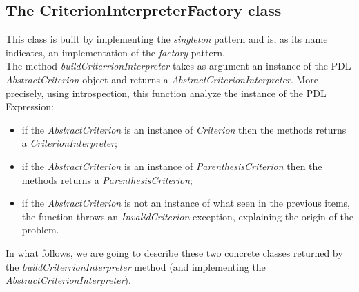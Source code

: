 \documentclass[a4paper,11pt] {ivoa}
\begin{document}
\subsection{The CriterionInterpreterFactory class}\label{criterionFactory}
This class is built by implementing the {\it singleton} pattern and is, as its name indicates, an implementation of the {\it factory} pattern.\\
The method {\it buildCriterrionInterpreter} takes as argument an instance of the PDL {\it AbstractCriterion} object and returns a {\it AbstractCriterionInterpreter}.
More precisely, using introspection, this function analyze the instance of the PDL Expression:
\begin{itemize}
\item if the {\it AbstractCriterion} is an instance of {\it Criterion} then the methods returns a {\it CriterionInterpreter};
\item if the {\it AbstractCriterion} is an instance of {\it ParenthesisCriterion} then the methods returns a {\it ParenthesisCriterion};
\item if the {\it AbstractCriterion} is not an instance of what seen in the previous items, the function throws an {\it InvalidCriterion} exception, explaining the origin of the problem.
\end{itemize} 
In what follows, we are going to describe these two concrete classes returned by the  {\it buildCriterrionInterpreter} method (and implementing the {\it AbstractCriterionInterpreter}).
\end{document}
